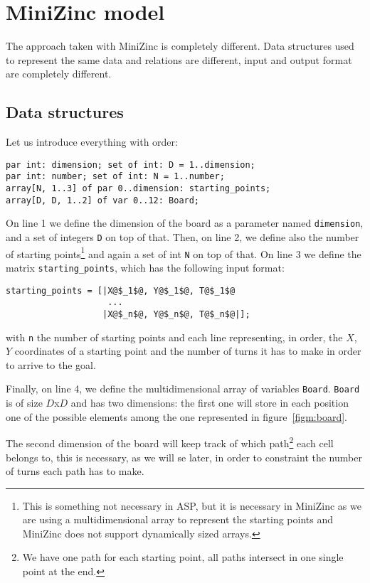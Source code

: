 \section{MiniZinc model}

The approach taken with MiniZinc is completely different. Data structures used to represent the same data and relations are different, input and output format are completely different.
\subsection{Data structures}
Let us introduce everything with order:
\begin{verbatim}
par int: dimension; set of int: D = 1..dimension; 
par int: number; set of int: N = 1..number; 
array[N, 1..3] of par 0..dimension: starting_points; 
array[D, D, 1..2] of var 0..12: Board;
\end{verbatim}


On line 1 we define the dimension of the board as a parameter named \texttt{dimension}, and a set of integers \texttt{D} on top of that.
Then, on line 2, we define also the number of starting points\footnote{This is something not necessary in ASP, but it is necessary in MiniZinc as we are using a multidimensional array to represent the starting points and MiniZinc does not support dynamically sized arrays.} and again a set of int \texttt{N} on top of that.
On line 3 we define the matrix \texttt{starting_points}, which has the following input format:
\begin{verbatim}
starting_points = [|X@$_1$@, Y@$_1$@, T@$_1$@
                    ...
                   |X@$_n$@, Y@$_n$@, T@$_n$@|];
\end{verbatim}
with  \texttt{n} the number of starting points and each line representing, in order, the $X$, $Y$ coordinates of a starting point and the number of turns it has to make in order to arrive to the goal.


Finally, on line 4, we define the multidimensional array of variables \texttt{Board}. \texttt{Board} is of size $D$x$D$ and has two dimensions: the first one will store in each position one of the possible elements among the one represented in figure~\ref{figm:board}.

The second dimension of the board will keep track of which path\footnote{We have one path for each starting point, all paths intersect in one single point at the end.} each cell belongs to, this is necessary, as we will se later, in order to constraint the number of turns each path has to make.

